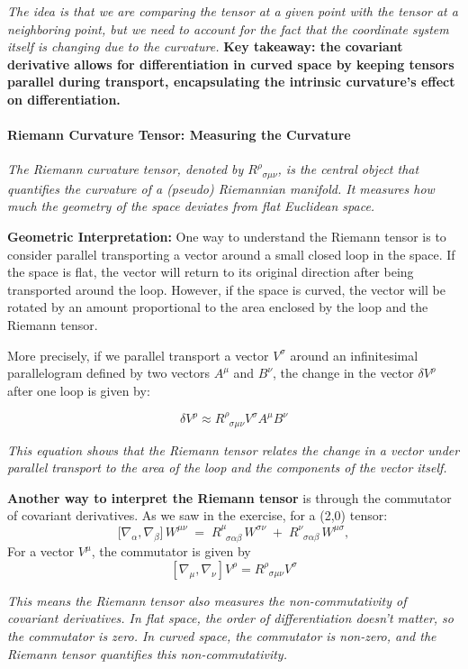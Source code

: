 \textit{The idea is that we are comparing the tensor at a given point with the tensor at a neighboring point, but we need to account for the fact that the coordinate system itself is changing due to the curvature.}
\textbf{Key takeaway: the covariant derivative allows for differentiation in curved space by keeping tensors parallel during transport, encapsulating the intrinsic curvature's effect on differentiation.}

\paragraph{Riemann Curvature Tensor: Measuring the Curvature}

\textit{The Riemann curvature tensor, denoted by \(R^\rho_{\;\;\sigma\mu\nu}\), is the central object that quantifies the curvature of a (pseudo) Riemannian manifold. It measures how much the geometry of the space deviates from flat Euclidean space.}

\textbf{Geometric Interpretation:} One way to understand the Riemann tensor is to consider parallel transporting a vector around a small closed loop in the space. If the space is flat, the vector will return to its original direction after being transported around the loop. However, if the space is curved, the vector will be rotated by an amount proportional to the area enclosed by the loop and the Riemann tensor.

More precisely, if we parallel transport a vector \(V^\sigma\) around an infinitesimal parallelogram defined by two vectors \(A^\mu\) and \(B^\nu\), the change in the vector \(\delta V^\rho\) after one loop is given by:

\[
\delta V^\rho \approx R^\rho_{\;\;\sigma\mu\nu} V^\sigma A^\mu B^\nu
\]

\textit{This equation shows that the Riemann tensor relates the change in a vector under parallel transport to the area of the loop and the components of the vector itself.}

\textbf{Another way to interpret the Riemann tensor} is through the commutator of covariant derivatives. As we saw in the exercise, for a (2,0) tensor:
\[
\bigl[\nabla_{\alpha}, \nabla_{\beta}\bigr]\,W^{\mu\nu}
\;=\;
R^\mu_{\;\;\sigma\alpha\beta}\,W^{\sigma\nu}
\;+\;
R^\nu_{\;\;\sigma\alpha\beta}\,W^{\mu\sigma},
\]
For a vector \(V^\mu\), the commutator is given by
\[
[\nabla_\mu, \nabla_\nu] V^\rho = R^\rho_{\;\;\sigma\mu\nu} V^\sigma
\]

\textit{This means the Riemann tensor also measures the non-commutativity of covariant derivatives. In flat space, the order of differentiation doesn't matter, so the commutator is zero. In curved space, the commutator is non-zero, and the Riemann tensor quantifies this non-commutativity.}


